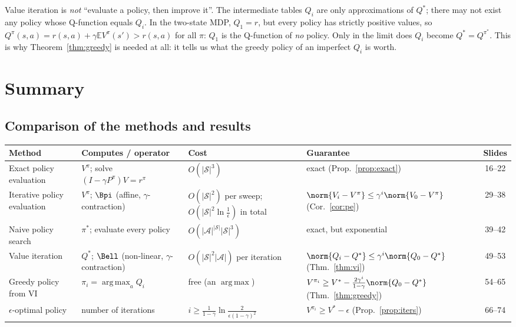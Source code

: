 \documentclass[11pt,a4paper]{article}
\newcommand{\E}{\mathbb{E}}
\DeclareMathOperator*{\argmax}{arg\,max}
\newcommand{\cS}{\mathcal{S}}
\newcommand{\cA}{\mathcal{A}}
\theoremstyle{plain}
\theoremstyle{definition}
\theoremstyle{remark}
\begin{document}
\begin{intuition}
Value iteration is \emph{not} ``evaluate a policy, then improve it''. The intermediate tables $Q_i$ are only approximations of $Q^*$; there may not exist any policy whose Q-function equals $Q_i$. In the two-state MDP, $Q_1=r$, but every policy has strictly positive values, so $Q^\pi(s,a)=r(s,a)+\gamma\E V^\pi(s')>r(s,a)$ for all $\pi$: $Q_1$ is the Q-function of \emph{no} policy. Only in the limit does $Q_i$ become $Q^*=Q^{\pi^*}$. This is why Theorem~\ref{thm:greedy} is needed at all: it tells us what the greedy policy of an imperfect $Q_i$ is worth.
\end{intuition}
\section{Summary}
\subsection{Comparison of the methods and results}
\begin{center}
\small
\renewcommand{\arraystretch}{1.25}
\begin{tabular}{@{}>{\raggedright\arraybackslash}p{2.5cm}>{\raggedright\arraybackslash}p{2.9cm}>{\raggedright\arraybackslash}p{3.7cm}>{\raggedright\arraybackslash}p{4.9cm}c@{}}
\toprule
\textbf{Method} & \textbf{Computes / operator} & \textbf{Cost} & \textbf{Guarantee} & \textbf{Slides}\\
\midrule
Exact policy evaluation & $V^\pi$; solve $(I-\gamma P^\pi)V=r^\pi$ & $O(|\cS|^3)$ & exact (Prop.~\ref{prop:exact}) & 16--22\\
Iterative policy evaluation & $V^\pi$; $\Bpi$ (affine, $\gamma$-contraction) & $O(|\cS|^2)$ per sweep; $O(|\cS|^2\ln\frac1\epsilon)$ in total & $\norm{V_i-V^\pi}\le\gamma^i\norm{V_0-V^\pi}$ (Cor.~\ref{cor:pe}) & 29--38\\
Naive policy search & $\pi^*$; evaluate every policy & $O(|\cA|^{|\cS|}|\cS|^3)$ & exact, but exponential & 39--42\\
Value iteration & $Q^*$; $\Bell$ (non-linear, $\gamma$-contraction) & $O(|\cS|^2|\cA|)$ per iteration & $\norm{Q_i-Q^*}\le\gamma^i\norm{Q_0-Q^*}$ (Thm.~\ref{thm:vi}) & 49--53\\
Greedy policy from VI & $\pi_i=\argmax_aQ_i$ & free (an $\argmax$) & $V^{\pi_i}\ge V^*-\frac{2\gamma^i}{1-\gamma}\norm{Q_0-Q^*}$ (Thm.~\ref{thm:greedy}) & 54--65\\
$\epsilon$-optimal policy & number of iterations & $i\ge\frac1{1-\gamma}\ln\frac{2}{\epsilon(1-\gamma)^2}$ & $V^{\pi_i}\ge V^*-\epsilon$ (Prop.~\ref{prop:iters}) & 66--74\\
\bottomrule
\end{tabular}
\end{center}
\end{document}
